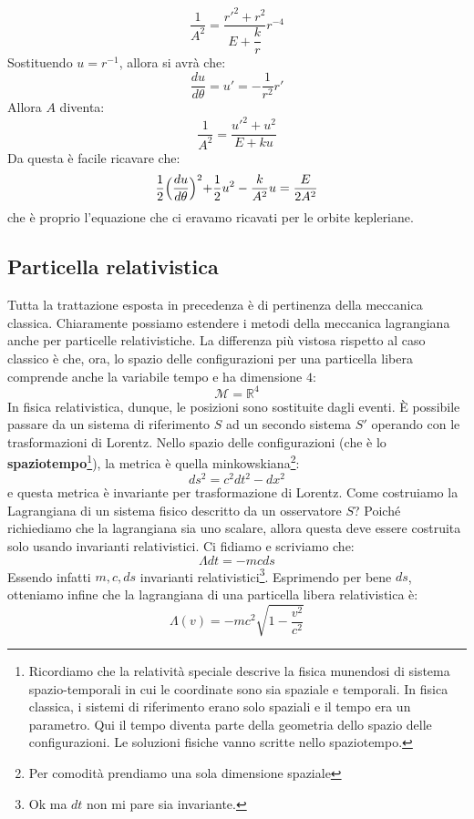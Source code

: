 \documentclass[a4paper,openany]{article}
\begin{document}
	\begin{equation}\label{key}
		\dfrac{1}{A^2} = \dfrac{r'^2+r^2}{E+\dfrac{k}{r}}r^{-4}
	\end{equation}
	Sostituendo $u = r^{-1}$, allora si avrà che:
	$$
	\dfrac{du}{d\theta}=u'=-\dfrac{1}{r^2}r'
	$$
	Allora $A$ diventa:
	\begin{equation}\label{key}
		\dfrac{1}{A^2}  = \dfrac{u'^2 + u^2}{E+ku}
	\end{equation}
	Da questa è facile ricavare che:
	\begin{equation}\label{key}
		\dfrac{1}{2}\Bigl(\dfrac{du}{d\theta}\Bigl)^2+\dfrac{1}{2}u^2-\dfrac{k}{A^2}u=\dfrac{E}{2A^2}
	\end{equation}
	che è proprio l'equazione che ci eravamo ricavati per le orbite kepleriane. 
	\subsection{Particella relativistica}
	Tutta la trattazione esposta in precedenza è di pertinenza della meccanica classica. Chiaramente possiamo estendere i metodi della meccanica lagrangiana anche per particelle relativistiche. La differenza più vistosa rispetto al caso classico è che, ora, lo spazio delle configurazioni per una particella libera comprende anche la variabile tempo e ha dimensione $4$:
	\begin{equation}\label{key}
		\mathcal{M} = \mathbb{R}^4
	\end{equation}
	In fisica relativistica, dunque, le posizioni sono sostituite dagli eventi.
	È possibile passare da un sistema di riferimento $S$ ad un secondo sistema $S'$ operando con le trasformazioni di Lorentz. Nello spazio delle configurazioni (che è lo \textbf{spaziotempo}\footnote{Ricordiamo che la relatività speciale descrive la fisica munendosi di sistema spazio-temporali in cui le coordinate sono sia spaziale e temporali. In fisica classica, i sistemi di riferimento erano solo spaziali e il tempo era un parametro. Qui il tempo diventa parte della geometria dello spazio delle configurazioni. Le soluzioni fisiche vanno scritte nello spaziotempo.}), la metrica è quella minkowskiana\footnote{Per comodità prendiamo una sola dimensione spaziale}:
	\begin{equation}\label{key}
		ds^2 = c^2dt^2-dx^2
	\end{equation}
	e questa metrica è invariante per trasformazione di Lorentz. Come costruiamo la Lagrangiana di un sistema fisico descritto da un osservatore $S$? Poiché richiediamo che la lagrangiana sia uno scalare, allora questa deve essere costruita solo usando invarianti relativistici. Ci fidiamo e scriviamo che:
	\begin{equation}\label{key}
		\Lambda dt = -mcds
	\end{equation}
	Essendo infatti $m,c,ds$ invarianti relativistici\footnote{Ok ma $dt$ non mi pare sia invariante.}. Esprimendo per bene $ds$, otteniamo infine che la lagrangiana di una particella libera relativistica è:
	\begin{equation}\label{key}
		\Lambda(v)= -mc^2\sqrt{1-\dfrac{v^2}{c^2}}
	\end{equation}
	\newpage
	
\end{document}
